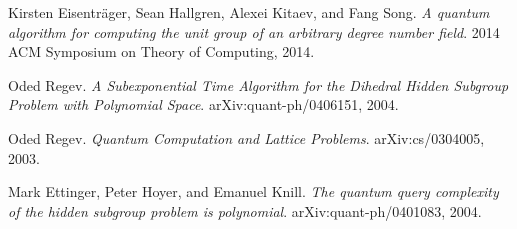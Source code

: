 \documentclass[dvips,12pt]{article}
\theoremstyle{plain}
\theoremstyle{definition}
\begin{document}
%

\newpage
%
\begin{thebibliography}{9}

 Kirsten Eisentr{\"a}ger, Sean Hallgren, Alexei Kitaev, and Fang Song.
 \emph{A quantum algorithm for computing the unit group of an arbitrary degree number field}. 2014 ACM Symposium on Theory of Computing, 2014.

 Oded Regev.
 \emph{A Subexponential Time Algorithm for the Dihedral Hidden Subgroup Problem with Polynomial Space}. arXiv:quant-ph/0406151, 2004.
 
 Oded Regev.
 \emph{Quantum Computation and Lattice Problems}. arXiv:cs/0304005, 2003.
 
 Mark Ettinger, Peter Hoyer, and Emanuel Knill.
 \emph{The quantum query complexity of the hidden subgroup problem is polynomial}. arXiv:quant-ph/0401083, 2004.

\end{thebibliography}
%
\end{document}
